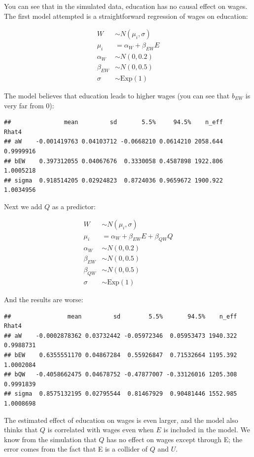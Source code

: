 \documentclass[
]{book}
\begin{document}
You can see that in the simulated data, education has no causal effect on wages. The first model attempted is a straightforward regression of wages on education:

\[
\begin{aligned}
W &\sim N(\mu_i, \sigma)\\
\mu_i &= \alpha_W + \beta_{EW}E\\
\alpha_W &\sim N(0,0.2)\\
\beta_{EW} &\sim N(0,0.5)\\
\sigma &\sim \text{Exp}(1)
\end{aligned}
\]

The model believes that education leads to higher wages (you can see that \(b_{EW}\) is very far from 0):

\begin{verbatim}
##               mean         sd       5.5%     94.5%    n_eff     Rhat4
## aW    -0.001419763 0.04103712 -0.0668210 0.0614210 2058.644 0.9999916
## bEW    0.397312055 0.04067676  0.3330058 0.4587898 1922.806 1.0005218
## sigma  0.918514205 0.02924823  0.8724036 0.9659672 1900.922 1.0034956
\end{verbatim}

Next we add \(Q\) as a predictor:

\[
\begin{aligned}
W &\sim N(\mu_i, \sigma)\\
\mu_i &= \alpha_W + \beta_{EW}E + \beta_{QW}Q\\
\alpha_W &\sim N(0,0.2)\\
\beta_{EW} &\sim N(0,0.5)\\
\beta_{QW} &\sim N(0,0.5)\\
\sigma &\sim \text{Exp}(1)
\end{aligned}
\]

And the results are worse:

\begin{verbatim}
##                mean         sd        5.5%       94.5%    n_eff     Rhat4
## aW    -0.0002878362 0.03732442 -0.05972346  0.05953473 1940.322 0.9988731
## bEW    0.6355551170 0.04867284  0.55926847  0.71532664 1195.392 1.0002084
## bQW   -0.4058662475 0.04678752 -0.47877007 -0.33126016 1205.308 0.9991839
## sigma  0.8575132195 0.02795544  0.81467929  0.90481446 1552.985 1.0008698
\end{verbatim}

The estimated effect of education on wages is even larger, and the model also thinks that \(Q\) is correlated with wages even when \(E\) is included in the model. We know from the simulation that \(Q\) has no effect on wages except through E; the error comes from the fact that E is a collider of \(Q\) and \(U\).
\end{document}
